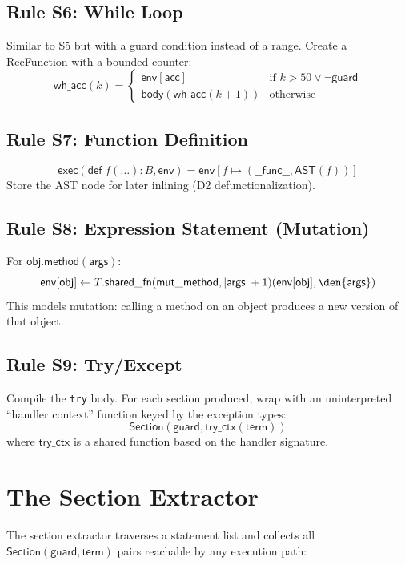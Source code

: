 \subsection{Rule S6: While Loop}

Similar to S5 but with a guard condition instead of a range.
Create a RecFunction with a bounded counter:
\[
  \mathsf{wh\_acc}(k) = \begin{cases}
    \mathsf{env}[\mathsf{acc}] & \text{if } k > 50 \lor
      \lnot\mathsf{guard} \\
    \mathsf{body}(\mathsf{wh\_acc}(k+1)) & \text{otherwise}
  \end{cases}
\]

\subsection{Rule S7: Function Definition}
\[
  \mathsf{exec}(\mathsf{def}\; f(\ldots): B, \mathsf{env}) =
    \mathsf{env}[f \mapsto (\mathsf{\_\_func\_\_}, \mathsf{AST}(f))]
\]
Store the AST node for later inlining (D2 defunctionalization).

\subsection{Rule S8: Expression Statement (Mutation)}

For $\mathsf{obj.method}(\mathsf{args})$:
\[
  \mathsf{env}[\mathsf{obj}] \leftarrow T.\mathsf{shared\_fn}(
    \mathsf{mut\_method}, |\mathsf{args}|+1)(\mathsf{env}[\mathsf{obj}],
    \den{\mathsf{args}})
\]
This models mutation: calling a method on an object produces a new
version of that object.

\subsection{Rule S9: Try/Except}

Compile the \texttt{try} body.  For each section produced, wrap with
an uninterpreted ``handler context'' function keyed by the exception
types:
\[
  \mathsf{Section}(\mathsf{guard}, \mathsf{try\_ctx}(\mathsf{term}))
\]
where $\mathsf{try\_ctx}$ is a shared function based on the handler
signature.

\section{The Section Extractor}

The section extractor traverses a statement list and collects all
$\mathsf{Section}(\mathsf{guard}, \mathsf{term})$ pairs reachable
by any execution path:

